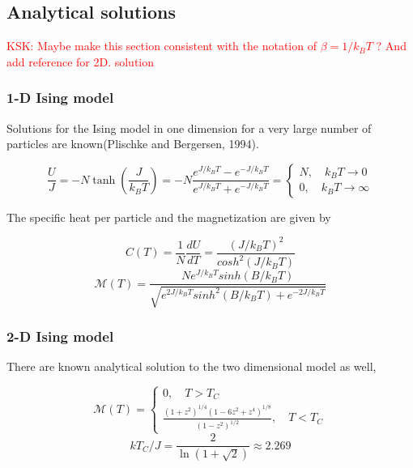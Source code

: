 \documentclass[11pt,a4paper,english]{article}
\numberwithin{equation}{section}
\newcommand{\magM}{\mathcal{M}}
\begin{document}
\subsection{Analytical solutions}

\textcolor{red}{KSK: Maybe make this section consistent with the notation of $\beta = 1/ k_B T$ ? And add reference for 2D. solution}

\subsubsection{1-D Ising model}
Solutions for the Ising model in one dimension for a very large number of particles are known(Plischke and Bergersen, 1994). 

\begin{equation}
\frac{U}{J} = -N \tanh \left( \frac{J}{k_B T} \right) = -N \frac{e^{J/k_B T}-e^{-J/k_B T} }{e^{J/k_B T}+ e^{-J/k_B T} } =  \begin{cases} N, \quad k_B T \to 0 \\ 0, \quad  k_B T \to \infty \end{cases}
\end{equation}

The specific heat per particle and the magnetization are given by 

\begin{equation}
C(T) = \frac{1}{N} \frac{dU}{dT} = \frac{(J/k_B T)^2}{cosh^2 (J/k_B T)}
\end{equation}
\begin{equation}
\magM(T) = \frac{N e^{J / k_B T} sinh(B/k_B T) }{ \sqrt{ e^{2J/k_B T} sinh^2 (B/k_B T) + e^{-2J/ k_B T}  } }
\end{equation}

\subsubsection{2-D Ising model}
There are known analytical solution to the two dimensional model as well, 

\begin{equation}
\magM (T) = \begin{cases} 0, \quad T > T_C \\ \frac{(1+z^2)^{1/4} (1-6z^2 + z^4 )^{1/8} }{(1-z^2)^{1/2}}, \quad T < T_C \end{cases}
\end{equation}
\begin{equation}
k T_C/J = \frac{2}{\ln(1+ \sqrt{2}) } \approx 2.269
\end{equation}
\end{document}
